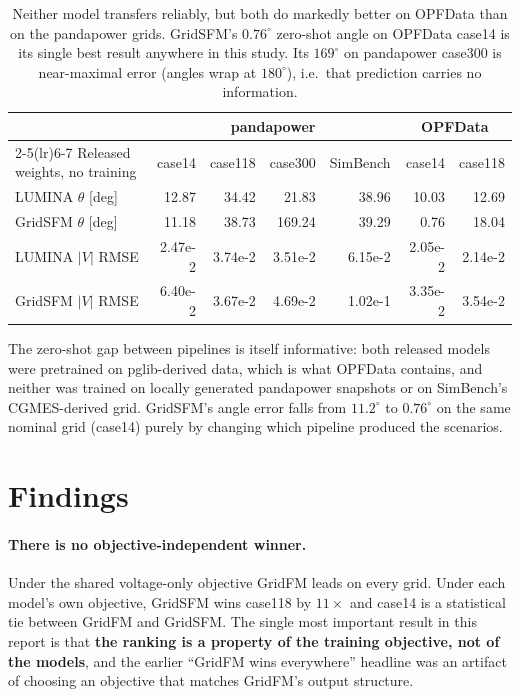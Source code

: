 \documentclass[10pt]{article}
\begin{document}
\begin{table}[H]
\centering
\small
\begin{tabular}{lrrrrrr}
\toprule
 & \multicolumn{4}{c}{pandapower} & \multicolumn{2}{c}{OPFData} \\
\cmidrule(lr){2-5}\cmidrule(lr){6-7}
Released weights, no training & case14 & case118 & case300 & SimBench & case14 & case118 \\
\midrule
LUMINA \(\theta\) [deg]  & 12.87 & 34.42 & 21.83 & 38.96 & 10.03 & 12.69 \\
GridSFM \(\theta\) [deg] & 11.18 & 38.73 & 169.24 & 39.29 & 0.76 & 18.04 \\
LUMINA \(|V|\) RMSE      & 2.47e-2 & 3.74e-2 & 3.51e-2 & 6.15e-2 & 2.05e-2 & 2.14e-2 \\
GridSFM \(|V|\) RMSE     & 6.40e-2 & 3.67e-2 & 4.69e-2 & 1.02e-1 & 3.35e-2 & 3.54e-2 \\
\bottomrule
\end{tabular}
\caption{Neither model transfers reliably, but both do markedly better on
OPFData than on the pandapower grids. GridSFM's \(0.76^\circ\) zero-shot angle
on OPFData case14 is its single best result anywhere in this study.
Its \(169^\circ\) on pandapower case300 is near-maximal error (angles wrap at
\(180^\circ\)), i.e.\ that prediction carries no information.}
\end{table}

The zero-shot gap between pipelines is itself informative: both released models
were pretrained on pglib-derived data, which is what OPFData contains, and
neither was trained on locally generated pandapower snapshots or on SimBench's
CGMES-derived grid. GridSFM's angle error falls from \(11.2^\circ\) to
\(0.76^\circ\) on the same nominal grid (case14) purely by changing which
pipeline produced the scenarios.

\section{Findings}

\paragraph{There is no objective-independent winner.} Under the shared
voltage-only objective GridFM leads on every grid. Under each model's own
objective, GridSFM wins case118 by \(11\times\) and case14 is a statistical tie
between GridFM and GridSFM. The single most important result in this report is
that \textbf{the ranking is a property of the training objective, not of the
models}, and the earlier ``GridFM wins everywhere'' headline was an artifact of
choosing an objective that matches GridFM's output structure.
\end{document}
